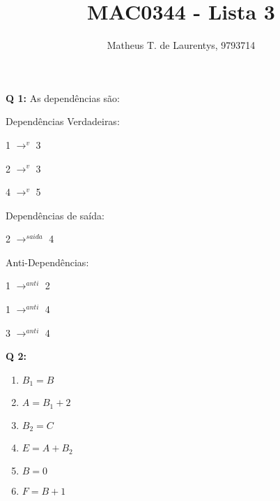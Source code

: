 \documentclass[]{article}
\title{\vspace{-4.0cm}MAC0344 - Lista 3}
\author{Matheus T. de Laurentys, 9793714}
\begin{document}
	\maketitle
	\noindent
	\textbf{Q 1:} As dependências são:
	\begin{description}
		\item Dependências Verdadeiras:
			\begin{description}
			\item 1 $\rightarrow^{v}$ 3
			\item 2 $\rightarrow^{v}$ 3
			\item 4 $\rightarrow^{v}$ 5 
		\end{description}
			\item Dependências de saída:
		\begin{description}
			\item 2 $\rightarrow^{saida}$ 4
		\end{description}
			\item Anti-Dependências:
		\begin{description}
			\item 1 $\rightarrow^{anti}$ 2
			\item 1 $\rightarrow^{anti}$ 4
			\item 3 $\rightarrow^{anti}$ 4
		\end{description}
	\end{description} 	
	\textbf{Q 2:} 
	\begin{enumerate}
		\item $B_1 = B$
		\item $A = B_1 + 2$
		\item $B_2 = C$ 
		\item $E = A + B_2$
		\item $B = 0$
		\item $F = B + 1$
	\end{enumerate}
\end{document}
